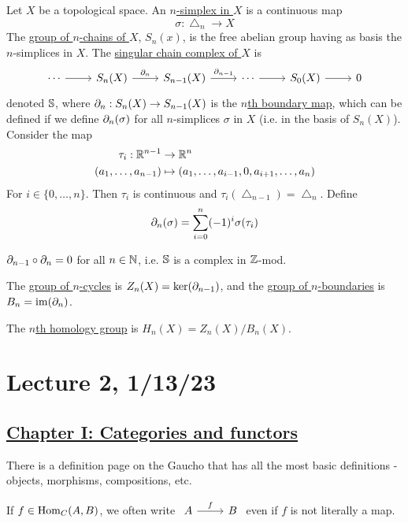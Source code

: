 \documentclass[x11names,reqno,14pt]{extarticle}
\begin{document}

Let $X$ be a topological space. An \underline{$n$-simplex in $X$} is a continuous map
\[
\sigma:\bigtriangleup_n\to X
\]
The \underline{group of $n$-chains of $X$}, $S_n(x)$, is the free abelian group having as basis the $n$-simplices in $X$. The \underline{singular chain complex of $X$} is
\[
\begin{tikzcd} 
\cdots\ar[r]&S_n(X)\ar[r,"\del_n"] &S_{n -1}(X)\ar[r, "\del_{n - 1}"] &\cdots\ar[r] &S_0(X)\ar[r] &0
\end{tikzcd}
\]
denoted $\mathbb{S}$, where $\partial_n:S_n(X)\to S_{n - 1}(X)$ is the \underline{$n$th boundary map}, which can be defined if we define $\partial_n(\sigma)$ for all $n$-simplices $\sigma$ in $X$ (i.e. in the basis of $S_n(X)$). Consider the map
\begin{align*}
\tau_i:\mathbb{R}^{n - 1} & \to \mathbb{R}^n \\
(a_1, \dots, a_{n - 1})&\mapsto(a_1, \dots, a_{i - 1}, 0, a_{i + 1}, \dots, a_n) \\
\end{align*}
For $i \in \{0, \dots, n\}$. Then $\tau_i$ is continuous and $\tau_i(\bigtriangleup_{n - 1}) = \bigtriangleup_n$. Define
\[
\partial_n(\sigma) = \sum_{i = 0}^n(-1)^i\sigma(\tau_i)
\]

\thm $\partial_{n - 1}\circ\partial_n = 0$ for all $n \in \mathbb{N}$, i.e. $\mathbb{S}$ is a complex in $\mathbb{Z}$-mod. 


The \underline{group of $n$-cycles} is $Z_n(X) = \ker(\partial_{n - 1})$, and the \underline{group of $n$-boundaries} is $B_n = \operatorname{\mathrm{im}}(\partial_n)$. 

The \underline{$n$th homology group} is $H_n(X) = Z_n(X)/B_n(X)$.

\section*{Lecture 2, 1/13/23}

\subsection*{\underline{Chapter I: Categories and functors}}

There is a definition page on the Gaucho that has all the most basic definitions - objects, morphisms, compositions, etc. 

If $f \in {\mathrm{Hom}}_C(A, B)$, we often write $\begin{tikzcd} A\ar[r, "f"] & B \end{tikzcd}$ even if $f$ is not literally a map. 
\end{document}
